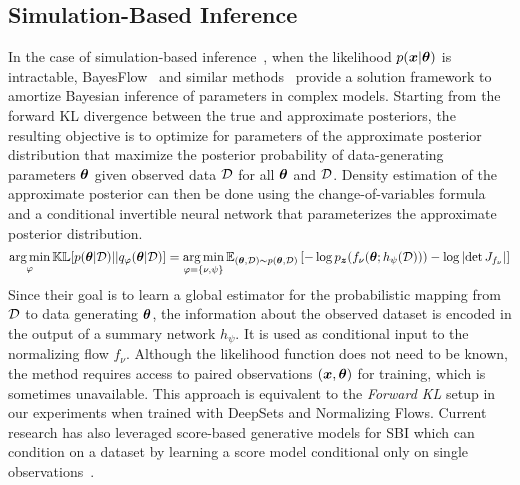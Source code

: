 \subsection{Simulation-Based Inference}
In the case of simulation-based inference~\citep{cranmer2020sbireview}, when the likelihood $p({\bm{x}}|{\bm{\theta}})$ is intractable, BayesFlow~\citep{radev2020bayesflow} and similar methods~\citep{lorch2022amortized} provide a solution framework to amortize Bayesian inference of parameters in complex models. Starting from the forward KL divergence between the true and approximate posteriors, the resulting objective is to optimize for parameters of the approximate posterior distribution that maximize the posterior probability of data-generating parameters ${\bm{\theta}}$ given observed data ${\mathcal{D}}$ for all ${\bm{\theta}}$ and ${\mathcal{D}}$. Density estimation of the approximate posterior can then be done using the change-of-variables formula and a conditional invertible neural network that parameterizes the approximate posterior distribution. 
\begin{equation}
    \operatorname*{arg\,min}_\varphi {\mathbb{K}}{\mathbb{L}}[p({\bm{\theta}}|{\mathcal{D}}) || q_\varphi({\bm{\theta}}|{\mathcal{D}})] = \operatorname*{arg\,min}_{\varphi=\{ \nu,\psi \}} {\mathbb{E}}_{({\bm{\theta}}, {\mathcal{D}}) \sim p({\bm{\theta}}, {\mathcal{D}})} \left[ - \log p_{\bm{z}}(f_\nu({\bm{\theta}}; h_\psi({\mathcal{D}}))) - \log \left|\det J_{f_\nu}\right| \right]
\end{equation}
Since their goal is to learn a global estimator for the probabilistic mapping from ${\mathcal{D}}$ to data generating ${\bm{\theta}}$, the information about the observed dataset is encoded in the output of a summary network $h_\psi$. It is used as conditional input to the normalizing flow $f_\nu$. Although the likelihood function does not need to be known, the method requires access to paired observations $({\bm{x}}, {\bm{\theta}})$ for training, which is sometimes unavailable. This approach is equivalent to the \textit{Forward KL} setup in our experiments when trained with DeepSets and Normalizing Flows. Current research has also leveraged score-based generative models for SBI which can condition on a dataset by learning a score model conditional only on single observations~\citep{geffner2023compositional}.

